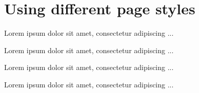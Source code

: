 \documentclass[a4paper,12pt,twoside]{book}
\begin{document}
\chapter{Using different page styles}

Lorem ipsum dolor sit amet, consectetur adipiscing ...

\newpage

Lorem ipsum dolor sit amet, consectetur adipiscing ...

\newpage

Lorem ipsum dolor sit amet, consectetur adipiscing ...

\newpage

Lorem ipsum dolor sit amet, consectetur adipiscing ...
\end{document}
